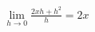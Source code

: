 \documentclass[preview]{standalone}
\begin{document}
\begin{align*}
\lim_{h \to 0} \frac{2xh + h^2}{h} = 2x
\end{align*}
\end{document}
